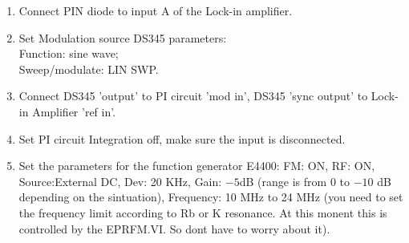 {\begin{enumerate}
\item Connect PIN diode to input A of the Lock-in amplifier.

\item Set Modulation source DS345 parameters:\\
\indent     Function:  sine wave;\\
\indent     Sweep/modulate: LIN SWP.\\

\item Connect DS345 'output' to PI circuit 'mod in', 
DS345 'sync output' to Lock-in Amplifier 'ref in'.

\item Set PI circuit Integration off, make sure the input is disconnected.

%
%
%
%

\item Set the parameters for the function generator E4400:
FM: ON,
RF: ON,
Source:External DC,
Dev: 20 KHz,
Gain: $-5$dB (range is from 0 to $-10$ dB depending on the sintuation),
Frequency: 10 MHz to 24 MHz (you need to set the frequency limit according 
to Rb or K resonance. At this monent this is controlled by the EPRFM.VI. 
So dont have to worry about it).


\end{enumerate}}
